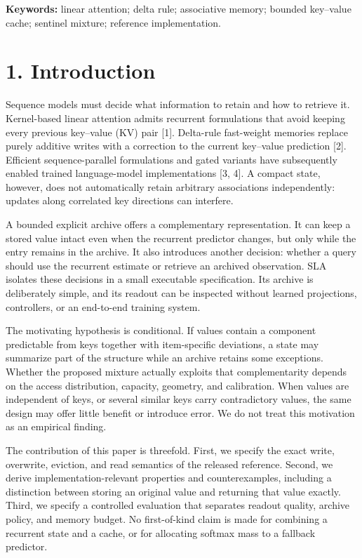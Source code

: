 \documentclass[11pt,a4paper]{article}
\begin{document}
\textbf{Keywords:} linear attention; delta rule; associative memory; bounded key--value cache; sentinel mixture; reference implementation.

\section{1. Introduction}\label{introduction}

Sequence models must decide what information to retain and how to retrieve it. Kernel-based linear attention admits recurrent formulations that avoid keeping every previous key--value (KV) pair {[}1{]}. Delta-rule fast-weight memories replace purely additive writes with a correction to the current key--value prediction {[}2{]}. Efficient sequence-parallel formulations and gated variants have subsequently enabled trained language-model implementations {[}3, 4{]}. A compact state, however, does not automatically retain arbitrary associations independently: updates along correlated key directions can interfere.

A bounded explicit archive offers a complementary representation. It can keep a stored value intact even when the recurrent predictor changes, but only while the entry remains in the archive. It also introduces another decision: whether a query should use the recurrent estimate or retrieve an archived observation. SLA isolates these decisions in a small executable specification. Its archive is deliberately simple, and its readout can be inspected without learned projections, controllers, or an end-to-end training system.

The motivating hypothesis is conditional. If values contain a component predictable from keys together with item-specific deviations, a state may summarize part of the structure while an archive retains some exceptions. Whether the proposed mixture actually exploits that complementarity depends on the access distribution, capacity, geometry, and calibration. When values are independent of keys, or several similar keys carry contradictory values, the same design may offer little benefit or introduce error. We do not treat this motivation as an empirical finding.

The contribution of this paper is threefold. First, we specify the exact write, overwrite, eviction, and read semantics of the released reference. Second, we derive implementation-relevant properties and counterexamples, including a distinction between storing an original value and returning that value exactly. Third, we specify a controlled evaluation that separates readout quality, archive policy, and memory budget. No first-of-kind claim is made for combining a recurrent state and a cache, or for allocating softmax mass to a fallback predictor.
\end{document}
